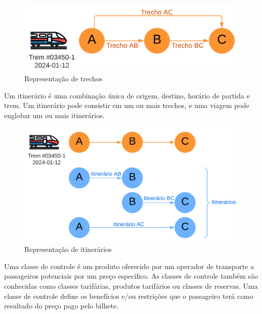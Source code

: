 \begin{description}[style=unboxed, leftmargin=0cm]
	      \begin{figure}[H]
		      \begin{center}
			      \includegraphics[scale=0.12]{img/trecho.png}
			      \caption{Representação de trechos}
			      \label{fig: trecho}
		      \end{center}
	      \end{figure}
	      \vspace{-1cm}

	\item[Itinerário:] Um itinerário é uma combinação única de origem, destino, horário de partida e trem. Um itinerário pode consistir em um ou mais trechos, e uma viagem pode englobar um ou mais itinerários.

	      \begin{figure}[H]
		      \begin{center}
			      \includegraphics[scale=0.12]{img/itinerario.png}
			      \caption{Representação de itinerários}
			      \label{fig: itinerario}
		      \end{center}
	      \end{figure}
	      \vspace{-1cm}

	\item[Classes de controle:] Uma classe de controle é um produto oferecido por um operador de transporte a passageiros potenciais por um preço específico. As classes de controle também são conhecidas como classes tarifárias, produtos tarifários ou classes de reservas. Uma classe de controle define os benefícios e/ou restrições que o passageiro terá como resultado do preço pago pelo bilhete.


\end{description}
